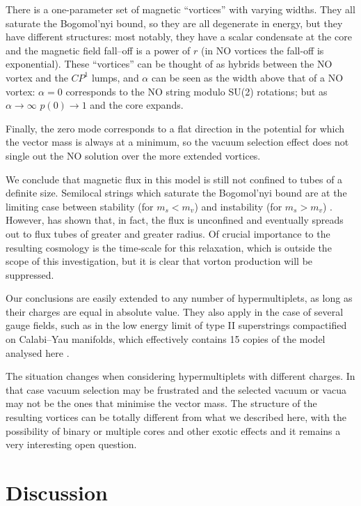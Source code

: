 \documentclass[a4paper,aps,prd,superscriptaddress,floats]{revtex4}
\begin{document}
There is a one-parameter set of magnetic ``vortices''
with varying widths.
They all saturate the Bogomol'nyi bound, so they are all degenerate in energy,
but they have different structures: most notably, they have a 
scalar condensate at the core and the magnetic field fall--off 
is a power of $r$ (in NO vortices the fall-off is exponential).
These ``vortices'' can be thought of as hybrids between the NO vortex 
and the $CP^1$ lumps, and
$\alpha$ can be seen 
as the width above that 
of a NO vortex: $\alpha = 0$ corresponds to the NO string modulo SU(2)
 rotations; but as $\alpha \to \infty$ $p(0) \to 1$ and the 
core expands.

Finally, the zero mode corresponds to a flat direction 
in the potential for which the vector mass is 
always at a minimum, so the vacuum selection effect 
does not single out the NO solution over the more extended vortices.

We conclude that magnetic flux in this model is still not confined to
tubes of a definite size. Semilocal strings which saturate the
Bogomol'nyi bound are at the limiting case between stability (for $m_s
< m_v$) and instability (for $m_s> m_v$) \cite{H92,AV00}.  However,
\cite{leese} has shown that, in fact, the flux is unconfined and
eventually spreads out to flux tubes of greater and greater radius. Of
crucial importance to the resulting cosmology is the time-scale for
this relaxation, which is outside the scope of this investigation, but
it is clear that vorton production will be suppressed.

Our conclusions are easily extended to any number of hypermultiplets,
as long as their charges are equal in absolute value. They also apply
in the case of several gauge fields, such as in the low energy
limit of type II superstrings compactified on Calabi--Yau manifolds,
which effectively contains 15 copies of the model analysed here
\cite{GMV96}.

The situation changes when considering hypermultiplets with different
charges. In that case vacuum selection may be frustrated and the
selected vacuum or vacua may not be the ones that minimise the vector
mass. The structure of the resulting vortices can be totally different
from what we described here, with the possibility of binary or
multiple cores and other exotic effects and it remains a very
interesting open question.

\section{Discussion}
\end{document}
